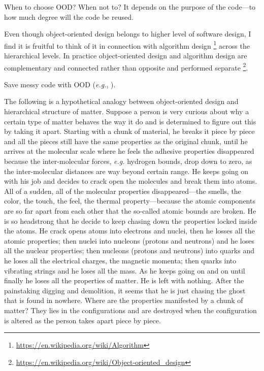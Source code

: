 When to choose OOD?
When not to?
It depends on the purpose of the code---to how much degree will the code be reused.

Even though object-oriented design belongs to higher level of software design, I find it is
fruitful to think of it in connection with algorithm design
\footnote{\url{https://en.wikipedia.org/wiki/Algorithm}} across the hierarchical levels.
In practice object-oriented design and algorithm design are complementary and connected
rather than opposite and performed separate
\footnote{\url{https://en.wikipedia.org/wiki/Object-oriented_design}}.

Save messy code with OOD (\textit{e.g.}, ).

The following is a hypothetical analogy between object-oriented design and hierarchical structure
of matter.
Suppose a person is very curious about why a certain type of matter behaves the way it do and is
determined to figure out this by taking it apart.
Starting with a chunk of material, he breaks it piece by piece and all the pieces still have the
same properties as the original chunk, until he arrives at the molecular scale where he
feels the adhesive properties disappeared because the inter-molecular forces, \textit{e.g.}
hydrogen bounds, drop down to zero, as the inter-molecular distances are way beyond certain
range.
He keeps going on with his job and decides to crack open the molecules and break them into atoms.
All of a sudden, all of the molecular properties disappeared---the smells, the color, the touch,
the feel, the thermal property---because the atomic components are so far apart from each
other that the so-called atomic bounds are broken.
He is so headstrong that he decide to keep chasing down the properties locked inside the atoms.
He crack opens atoms into electrons and nuclei, then he losses all the atomic properties;
then nuclei into nucleons (protons and neutrons) and he loses all the nuclear properties;
then nucleons (protons and neutrons) into quarks and he loses all the electrical charges, the
magnetic momenta;
then quarks into vibrating strings and he loses all the mass.
As he keeps going on and on until finally he loses all the properties of matter.
He is left with nothing.
After the painstaking digging and demolition, it seems that he is just chasing the
ghost that is found in nowhere.
Where are the properties manifested by a chunk of matter?
They lies in the configurations and are destroyed when the configuration is altered as the person
takes apart piece by piece.

